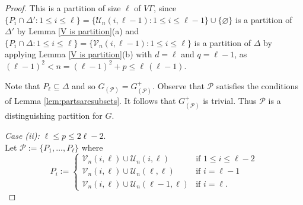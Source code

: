 \documentclass[11pt]{amsart}
\newtheorem{claim}{Claim}
\DeclareMathOperator{\Sym}{Sym}
\DeclareMathOperator{\Diag}{Diag}
\begin{document}
\begin{proof}
This is a partition of size $\ell$ of \(V\Gamma\),
since
\(
\{P_i \cap \Delta' : 1 \leq i \leq \ell\}
= \{\mathcal{U}_n(i, \ell-1) : 1 \leq i \leq \ell - 1\} \cup \{\varnothing\}
\)
is a partition of $\Delta'$ by Lemma \ref{V is partition}(a)
and \(
\{P_i \cap \Delta : 1 \leq i \leq \ell\}
= \{\mathcal{V}_n(i, \ell-1) : 1 \leq i \leq \ell\}
\)
is a partition of $\Delta$
by applying Lemma \ref{V is partition}(b) with $d = \ell$ and $q = \ell - 1$, as $(\ell-1)^2 < n = (\ell-1)^{2} + p \leqslant  \ell \, (\ell - 1).$

%



Note that \(P_{\ell}\subseteq\Delta\) and so $G_{(\mathcal{P})}=G^+_{(\mathcal{P})}$. 
Observe that \(\mathcal{P}\) satisfies the conditions of Lemma \ref{lem:partsaresubsets}. It follows that $G^+_{(\mathcal{P})}$ is trivial.
Thus $\mathcal{P}$ is a distinguishing partition for $G$.
% 
 

\medskip\noindent
\emph{Case (ii): \(\ell\leqslant p\leqslant 2\ell-2\)}.\\ Let \(\mathcal{P}:=\{P_{1},\ldots, P_{\ell}\}\) where
\begin{equation*}
    P_{i}:=\begin{cases}
       \mathcal{V}_n(i,\ell)\cup \mathcal{U}_n(i,\ell)&\text{if }1\leqslant i\leqslant \ell-2\\
        
        \mathcal{V}_n(i,\ell)\cup  \mathcal{U}_n(\ell,\ell)&\text{if } i = \ell-1\\
        
        \mathcal{V}_n(i,\ell)\cup  \mathcal{U}_n(\ell-1,\ell)&\text{if }i=\ell.
    \end{cases}
\end{equation*}


\end{proof}
\end{document}
